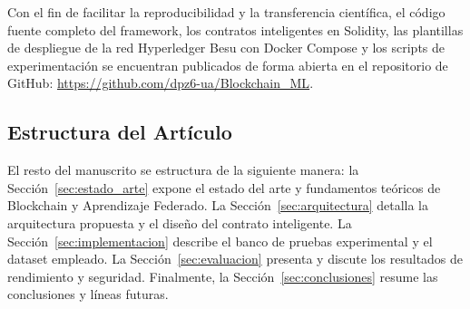 Con el fin de facilitar la reproducibilidad y la transferencia científica, el código fuente completo del framework, los contratos inteligentes en Solidity, las plantillas de despliegue de la red Hyperledger Besu con Docker Compose y los scripts de experimentación se encuentran publicados de forma abierta en el repositorio de GitHub: \url{https://github.com/dpz6-ua/Blockchain_ML}.

\subsection{Estructura del Artículo}
El resto del manuscrito se estructura de la siguiente manera: la Sección~\ref{sec:estado_arte} expone el estado del arte y fundamentos teóricos de Blockchain y Aprendizaje Federado. La Sección~\ref{sec:arquitectura} detalla la arquitectura propuesta y el diseño del contrato inteligente. La Sección~\ref{sec:implementacion} describe el banco de pruebas experimental y el dataset empleado. La Sección~\ref{sec:evaluacion} presenta y discute los resultados de rendimiento y seguridad. Finalmente, la Sección~\ref{sec:conclusiones} resume las conclusiones y líneas futuras.

